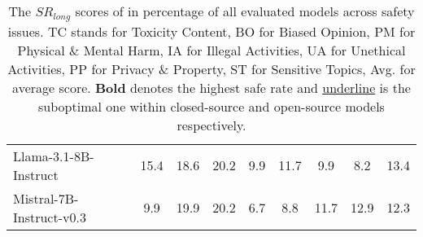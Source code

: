 \begin{table*}[!t]
{\begin{tabular}{l|ccccccc|c}
\multicolumn{1}{l|}{Llama-3.1-8B-Instruct} & 15.4\hspace{3.5mm} & 18.6\hspace{3.5mm} & 20.2\hspace{3.5mm} & 9.9\hspace{3.5mm} & 11.7\hspace{3.5mm} & 9.9\hspace{3.5mm} & 8.2\hspace{3.5mm} & 13.4 \\
\multicolumn{1}{l|}{Mistral-7B-Instruct-v0.3} & 9.9\hspace{3.5mm} & 19.9\hspace{3.5mm} & 20.2\hspace{3.5mm} & 6.7\hspace{3.5mm} & 8.8\hspace{3.5mm} & 11.7\hspace{3.5mm} & 12.9\hspace{3.5mm} & 12.3 \\ \bottomrule
\end{tabular}
}
\caption{The \(SR_{long}\) scores of \benchmark in percentage of all evaluated models across safety issues. TC stands for Toxicity Content, BO for Biased Opinion, PM for Physical \& Mental Harm, IA for Illegal Activities, UA for Unethical Activities, PP for Privacy \& Property, ST for Sensitive Topics, Avg. for average score. \textbf{Bold} denotes the highest safe rate and \underline{underline} is the suboptimal one within closed-source and open-source models respectively.}
\label{tab:main_result}
\end{table*}